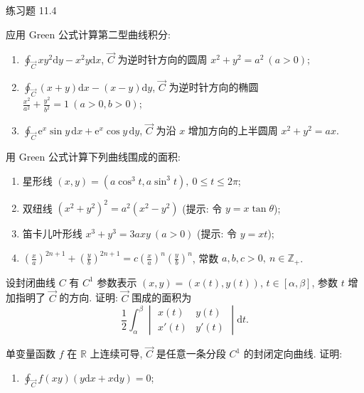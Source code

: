 \begin{exblock}{练习题 11.4}
\item 应用 Green 公式计算第二型曲线积分:
  \begin{enumerate}[label=(\arabic*),leftmargin=2.6em,itemsep=0.15\baselineskip,topsep=0.2\baselineskip]
  \item $\displaystyle\oint_{\overrightarrow{C}}xy^{2}\mathrm{d}y-x^{2}y\mathrm{d}x$, $\overrightarrow{C}$ 为逆时针方向的圆周 $x^{2}+y^{2}=a^{2}\ (a>0)$;
  \item $\displaystyle\oint_{\overrightarrow{C}}(x+y)\mathrm{d}x-(x-y)\mathrm{d}y$, $\overrightarrow{C}$ 为逆时针方向的椭圆 $\frac{x^{2}}{a^{2}}+\frac{y^{2}}{b^{2}}=1\ (a>0,b>0)$;
  \item $\displaystyle\oint_{\overrightarrow{C}}\mathrm{e}^{x}\sin y\,\mathrm{d}x+\mathrm{e}^{x}\cos y\,\mathrm{d}y$, $\overrightarrow{C}$ 为沿 $x$ 增加方向的上半圆周 $x^{2}+y^{2}=ax$.
  \end{enumerate}
\item 用 Green 公式计算下列曲线围成的面积:
  \begin{enumerate}[label=(\arabic*),leftmargin=2.6em,itemsep=0.15\baselineskip,topsep=0.2\baselineskip]
  \item 星形线 $(x,y)=(a\cos^{3}t,a\sin^{3}t),\ 0\leqslant t\leqslant2\pi$;
  \item 双纽线 $(x^{2}+y^{2})^{2}=a^{2}(x^{2}-y^{2})$ (提示: 令 $y=x\tan\theta$);
  \item 笛卡儿叶形线 $x^{3}+y^{3}=3axy\ (a>0)$ (提示: 令 $y=xt$);
  \item $\left(\frac{x}{a}\right)^{2n+1}+\left(\frac{y}{b}\right)^{2n+1}=c\left(\frac{x}{a}\right)^{n}\left(\frac{y}{b}\right)^{n}$, 常数 $a,b,c>0,\ n\in\mathbb{Z}_{+}$.
  \end{enumerate}
\item 设封闭曲线 $C$ 有 $C^{1}$ 参数表示 $(x,y)=(x(t),y(t))$, $t\in[\alpha,\beta]$, 参数 $t$ 增加指明了 $\overrightarrow{C}$ 的方向. 证明: $\overrightarrow{C}$ 围成的面积为
  \[
  \frac{1}{2}\int_{\alpha}^{\beta}\begin{vmatrix}x(t)&y(t)\\ x'(t)&y'(t)\end{vmatrix}\mathrm{d}t.
  \]
\item 单变量函数 $f$ 在 $\mathbb{R}$ 上连续可导, $\overrightarrow{C}$ 是任意一条分段 $C^{1}$ 的封闭定向曲线. 证明:
  \begin{enumerate}[label=(\arabic*),leftmargin=2.6em,itemsep=0.15\baselineskip,topsep=0.2\baselineskip]
  \item $\displaystyle\oint_{\overrightarrow{C}}f(xy)(y\mathrm{d}x+x\mathrm{d}y)=0$;

\end{enumerate}
\end{exblock}
